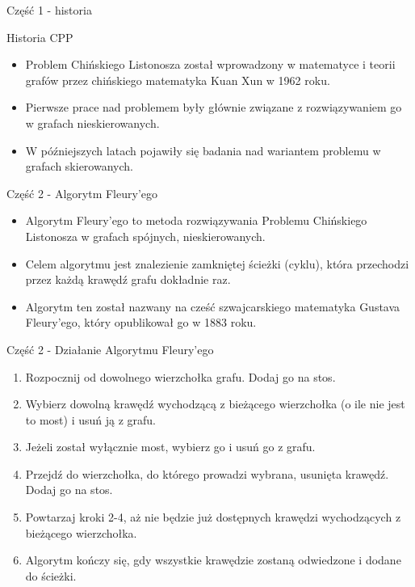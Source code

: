 \documentclass[polish,envcountsect,10pt]{beamer}
\begin{document}
\begin{frame}{Część 1 - historia}
    \begin{block}{Historia CPP}
        \begin{itemize}
            \item Problem Chińskiego Listonosza został wprowadzony w matematyce i teorii grafów przez chińskiego matematyka Kuan Xun w 1962 roku.
            \item Pierwsze prace nad problemem były głównie związane z rozwiązywaniem go w grafach nieskierowanych.
            \item W późniejszych latach pojawiły się badania nad wariantem problemu w grafach skierowanych.
        \end{itemize}
    \end{block}
\end{frame}

\begin{frame}{Część 2 - Algorytm Fleury'ego}
    \begin{itemize}
      \item Algorytm Fleury'ego to metoda rozwiązywania Problemu Chińskiego Listonosza w grafach spójnych, nieskierowanych.
      \item Celem algorytmu jest znalezienie zamkniętej ścieżki (cyklu), która przechodzi przez każdą krawędź grafu dokładnie raz.
      \item Algorytm ten został nazwany na cześć szwajcarskiego matematyka Gustava Fleury'ego, który opublikował go w 1883 roku.
    \end{itemize}
\end{frame}

\begin{frame}{Część 2 - Działanie Algorytmu Fleury'ego}
    \begin{enumerate}
        \item Rozpocznij od dowolnego wierzchołka grafu. Dodaj go na stos.
        \item Wybierz dowolną krawędź wychodzącą z bieżącego wierzchołka (o ile nie jest to most)  i usuń ją z grafu.
        \item Jeżeli został wyłącznie most, wybierz go i usuń go z grafu.
        \item Przejdź do wierzchołka, do którego prowadzi wybrana, usunięta krawędź. Dodaj go na stos.
        \item Powtarzaj kroki 2-4, aż nie będzie już dostępnych krawędzi wychodzących z bieżącego wierzchołka.
        \item Algorytm kończy się, gdy wszystkie krawędzie zostaną odwiedzone i dodane do ścieżki.
    \end{enumerate}
\end{frame}
\end{document}
